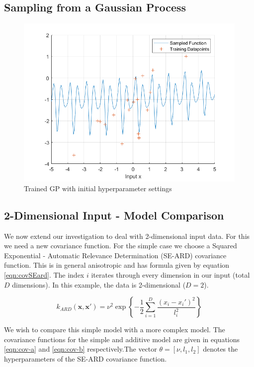 \documentclass[]{article}
\newcommand{\figwidth}{0.6\linewidth}
\begin{document}
\subsection{Sampling from a Gaussian Process}

\begin{figure}[!h]
	\centering
	\includegraphics[width=\figwidth]{1d}
	\caption{Trained GP with initial hyperparameter settings}
	\label{fig:1d}
\end{figure}

\subsection{2-Dimensional Input - Model Comparison}

We now extend our investigation to deal with 2-dimensional input data. For this we need a new covariance function. For the simple case we choose a Squared Exponential - Automatic Relevance Determination (SE-ARD) covariance function. This is in general anisotropic and has formula given by equation \ref{eqn:covSEard}. The index $i$ iterates through every dimension in our input (total $D$ dimensions). In this example, the data is 2-dimensional ($D=2$).

\begin{equation}
k_{ARD}(\mathbf{x}, \mathbf{x}') = \nu^2 \exp\left\{- \frac{1}{2} \sum_{i=1}^{D}\frac{(x_i-x_i')^2}{l_i^2}\right\}
\label{eqn:covSEard}
\end{equation}

We wish to compare this simple model with a more complex model. The covariance functions for the simple and additive model are given in equations \ref{eqn:cov-a} and \ref{eqn:cov-b} respectively.The vector $\theta = [\nu, l_1, l_2]$ denotes the hyperparameters of the SE-ARD covariance function.
\end{document}
